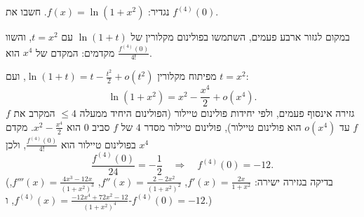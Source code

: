 
\begin{question}
נגדיר: $f(x)=\ln(1+x^2)$. חשבו את $f^{(4)}(0)$.
\end{question}

\begin{hint}
במקום לגזור ארבע פעמים, השתמשו בפולינום מקלורין של $\ln(1+t)$ עם $t=x^2$, והשוו מקדמים: המקדם של $x^4$ הוא $\frac{f^{(4)}(0)}{4!}$.
\end{hint}

\begin{solution}
מפיתוח מקלורין $\ln(1+t)=t-\frac{t^2}{2}+o(t^2)$, ועם $t=x^2$:
\[ \ln(1+x^2)=x^2-\frac{x^4}{2}+o(x^4). \]
$f$ גזירה אינסוף פעמים, ולפי יחידות פולינום טיילור (הפולינום היחיד ממעלה $\le4$ המקרב את $f$ עד $o(x^4)$ הוא פולינום טיילור), פולינום טיילור מסדר $4$ של $f$ סביב $0$ הוא $x^2-\frac{x^4}{2}$. מקדם $x^4$ בפולינום טיילור הוא $\frac{f^{(4)}(0)}{4!}$, ולכן
\[ \frac{f^{(4)}(0)}{24}=-\frac12\quad\Longrightarrow\quad\boxed{f^{(4)}(0)=-12}. \]
(בדיקה בגזירה ישירה: $f'(x)=\frac{2x}{1+x^2}$, $f''(x)=\frac{2-2x^2}{(1+x^2)^2}$, $f'''(x)=\frac{4x^3-12x}{(1+x^2)^3}$, $f^{(4)}(x)=\frac{-12x^4+72x^2-12}{(1+x^2)^4}$, ו-$f^{(4)}(0)=-12$.)
\end{solution}
